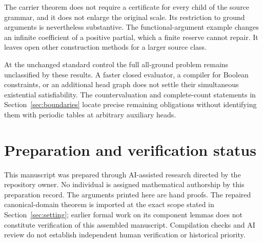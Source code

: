 \documentclass[11pt,a4paper]{article}
\numberwithin{equation}{section}
\theoremstyle{definition}
\theoremstyle{remark}
\begin{document}
The carrier theorem does not require a certificate for every child of
the source grammar, and it does not enlarge the original scale. Its
restriction to ground arguments is nevertheless substantive. The
functional-argument example changes an infinite coefficient of a
positive partial, which a finite reserve cannot repair. It leaves open
other construction methods for a larger source class.

At the unchanged standard control the full all-ground problem remains
unclassified by these results. A faster closed evaluator, a compiler
for Boolean constraints, or an additional head graph does not settle
their simultaneous existential satisfiability. The countervaluation and
complete-count statements in Section~\ref{sec:boundaries} locate precise
remaining obligations without identifying them with periodic tables at
arbitrary auxiliary heads.

\appendix


\section*{Preparation and verification status}

This manuscript was prepared through AI-assisted research directed by
the repository owner. No individual is assigned mathematical authorship
by this preparation record. The arguments printed here are hand proofs.
The repaired canonical-domain theorem is imported at the exact scope
stated in Section~\ref{sec:setting}; earlier formal work on its component
lemmas does not constitute verification of this assembled manuscript.
Compilation checks and AI review do not establish independent human
verification or historical priority.

\clearpage

\end{document}
